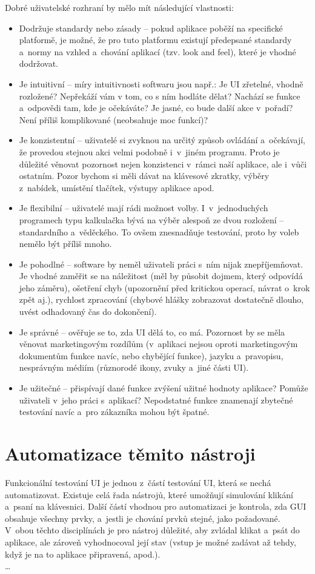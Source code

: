		Dobré uživatelské rozhraní by mělo mít následující vlastnosti:
			\begin{itemize}
				\item Dodržuje standardy nebo zásady -- pokud aplikace poběží na specifické platformě, je možné, že pro tuto platformu existují předepsané standardy a~normy na vzhled a~chování aplikací (tzv. look and feel), které je vhodné dodržovat.
				\item Je intuitivní -- míry intuitivnosti softwaru jsou např.: Je UI zřetelné, vhodně rozložené? Nepřekáží vám v tom, co s ním hodláte dělat? Nachází se funkce a~odpovědi tam, kde je očekáváte? Je jasné, co bude další akce v~pořadí? Není příliš komplikované (neobsahuje moc funkcí)?
				\item Je konzistentní -- uživatelé si zvyknou na určitý způsob ovládání a~očekávají, že provedou stejnou akci velmi podobně i~v~jiném programu. Proto je důležité věnovat pozornost nejen konzistenci v~rámci naší aplikace, ale i~vůči ostatním. Pozor bychom si měli dávat na klávesové zkratky, výběry z~nabídek, umístění tlačítek, výstupy aplikace apod.
				\item Je flexibilní -- uživatelé mají rádi možnost volby. I~v~jednoduchých programech typu kalkulačka bývá na výběr alespoň ze dvou rozložení -- standardního a~věděckého. To ovšem znesnadňuje testování, proto by voleb nemělo být příliš mnoho.
				\item Je pohodlné -- software by neměl uživateli práci s~ním nijak znepříjemňovat. Je vhodné zaměřit se na náležitost (měl by působit dojmem, který odpovídá jeho záměru), ošetření chyb (upozornění před kritickou operací, návrat o~krok zpět aj.), rychlost zpracování (chybové hlášky zobrazovat dostatečně dlouho, uvést odhadovaný čas do dokončení).
				\item Je správné -- ověřuje se to, zda UI dělá to, co má. Pozornost by se měla věnovat marketingovým rozdílům (v~aplikaci nejsou oproti marketingovým dokumentům funkce navíc, nebo chybějící funkce), jazyku a~pravopisu, nesprávným médiím (různorodé ikony, zvuky a~jiné části UI).
				\item Je užitečné -- přispívají dané funkce zvýšení užitné hodnoty aplikace? Pomůže uživateli v~jeho práci s~aplikací? Nepodstatné funkce znamenají zbytečné testování navíc a~pro zákazníka mohou být špatné.
			\end{itemize}
		
		\section{Automatizace těmito nástroji}
		Funkcionální testování UI je jednou z~částí testování UI, která se nechá automatizovat. Existuje celá řada nástrojů, které umožňují simulování klikání a~psaní na klávesnici. Další částí vhodnou pro automatizaci je kontrola, zda GUI obsahuje všechny prvky, a~jestli je chování prvků stejné, jako požadované. V~obou těchto disciplínách je pro nástroj důležité, aby zvládal klikat a~psát do aplikace, ale zároveň vyhodnocoval její stav (vstup je možné zadávat až tehdy, když je na to aplikace připravená, apod.).
		\\\dots